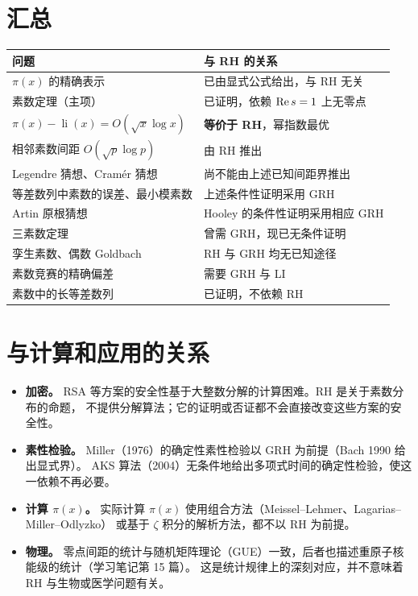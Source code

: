 \documentclass[11pt]{article}
\newcommand{\li}{\operatorname{li}}
\begin{document}
\section{汇总}
\begin{center}
\small
\renewcommand{\arraystretch}{1.25}
\begin{tabular}{>{\raggedright\arraybackslash}p{}>{\raggedright\arraybackslash}p{}}
\toprule
问题 & 与 RH 的关系\\
\midrule
$\pi(x)$ 的精确表示 & 已由显式公式给出，与 RH 无关\\
素数定理（主项） & 已证明，依赖 $\operatorname{Re} s=1$ 上无零点\\
$\pi(x)-\li(x)=O(\sqrt x\log x)$ & \textbf{等价于 RH}，幂指数最优\\
相邻素数间距 $O(\sqrt p\log p)$ & 由 RH 推出\\
Legendre 猜想、Cramér 猜想 & 尚不能由上述已知间距界推出\\
等差数列中素数的误差、最小模素数 & 上述条件性证明采用 GRH\\
Artin 原根猜想 & Hooley 的条件性证明采用相应 GRH\\
三素数定理 & 曾需 GRH，现已无条件证明\\
孪生素数、偶数 Goldbach & RH 与 GRH 均无已知途径\\
素数竞赛的精确偏差 & 需要 GRH 与 LI\\
素数中的长等差数列 & 已证明，不依赖 RH\\
\bottomrule
\end{tabular}
\end{center}

\section{与计算和应用的关系}
\begin{itemize}
 \item \textbf{加密。} RSA 等方案的安全性基于大整数分解的计算困难。RH 是关于素数分布的命题，
 不提供分解算法；它的证明或否证都不会直接改变这些方案的安全性。
 \item \textbf{素性检验。} Miller（1976）的确定性素性检验以 GRH 为前提（Bach 1990 给出显式界）。
 AKS 算法（2004）无条件地给出多项式时间的确定性检验，使这一依赖不再必要。
 \item \textbf{计算 $\pi(x)$。} 实际计算 $\pi(x)$ 使用组合方法（Meissel--Lehmer、Lagarias--Miller--Odlyzko）
 或基于 $\zeta$ 积分的解析方法，都不以 RH 为前提。
 \item \textbf{物理。} 零点间距的统计与随机矩阵理论（GUE）一致，后者也描述重原子核能级的统计（学习笔记第 15 篇）。
 这是统计规律上的深刻对应，并不意味着 RH 与生物或医学问题有关。
\end{itemize}
\end{document}
